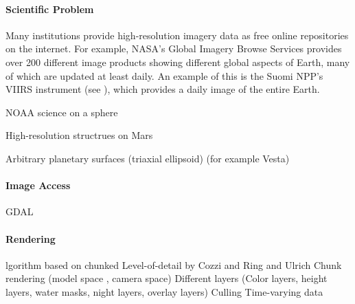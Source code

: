 \paragraph{Scientific Problem} \label{contributions:astro:gb:problem}
Many institutions provide high-resolution imagery data as free online repositories on the internet.  For example, NASA's Global Imagery Browse Services provides over 200 different image products showing different global aspects of Earth, many of which are updated at least daily.  An example of this is the Suomi NPP's VIIRS instrument (see ), which provides a daily image of the entire Earth.

NOAA science on a sphere

High-resolution structrues on Mars

Arbitrary planetary surfaces (triaxial ellipsoid) (for example Vesta)

\paragraph{Image Access} \label{contributions:astro:gb:access}
GDAL


\paragraph{Rendering} \label{contributions:astro:gb:rendering}
lgorithm based on chunked Level-of-detail by Cozzi and Ring \cite{cozzi20113d} and Ulrich \cite{ulrich2002rendering}
Chunk rendering  (model space , camera space)
Different layers (Color layers, height layers, water masks, night layers, overlay layers)
Culling
Time-varying data






